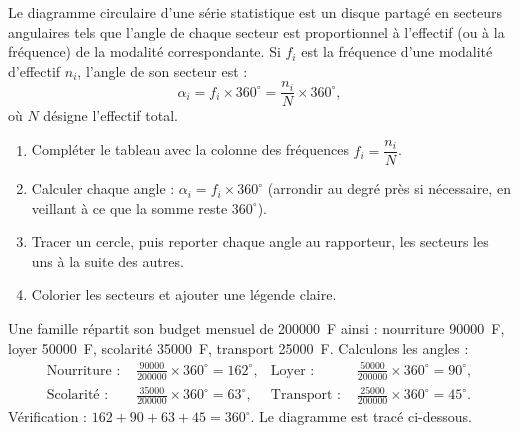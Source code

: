 \documentclass[11pt]{article}
\newcommand{\cle}[1]{{\popxbold\color{popdark}#1}}
\begin{document}
\begin{definition}
Le \cle{diagramme circulaire} d'une série statistique est un disque partagé en secteurs angulaires tels que l'angle de chaque secteur est proportionnel à l'effectif (ou à la fréquence) de la modalité correspondante. Si $f_i$ est la fréquence d'une modalité d'effectif $n_i$, l'angle de son secteur est :
\[ \alpha_i = f_i \times 360^{\circ} = \frac{n_i}{N}\times 360^{\circ}, \]
où $N$ désigne l'effectif total.
\end{definition}

\begin{methode}
\begin{enumerate}
\item Compléter le tableau avec la colonne des fréquences $f_i = \dfrac{n_i}{N}$.
\item Calculer chaque angle : $\alpha_i = f_i \times 360^{\circ}$ (arrondir au degré près si nécessaire, en veillant à ce que la somme reste $360^{\circ}$).
\item Tracer un cercle, puis reporter chaque angle au rapporteur, les secteurs les uns à la suite des autres.
\item Colorier les secteurs et ajouter une légende claire.
\end{enumerate}
\end{methode}

\begin{exemplebox}
Une famille répartit son budget mensuel de \SI{200000}{F} ainsi : nourriture \SI{90000}{F}, loyer \SI{50000}{F}, scolarité \SI{35000}{F}, transport \SI{25000}{F}. Calculons les angles :
\begin{align*}
\text{Nourriture : } & \frac{90000}{200000}\times 360^{\circ} = 162^{\circ}, &
\text{Loyer : } & \frac{50000}{200000}\times 360^{\circ} = 90^{\circ},\\
\text{Scolarité : } & \frac{35000}{200000}\times 360^{\circ} = 63^{\circ}, &
\text{Transport : } & \frac{25000}{200000}\times 360^{\circ} = 45^{\circ}.
\end{align*}
Vérification : $162 + 90 + 63 + 45 = 360^{\circ}$. Le diagramme est tracé ci-dessous.
\end{exemplebox}
\end{document}

